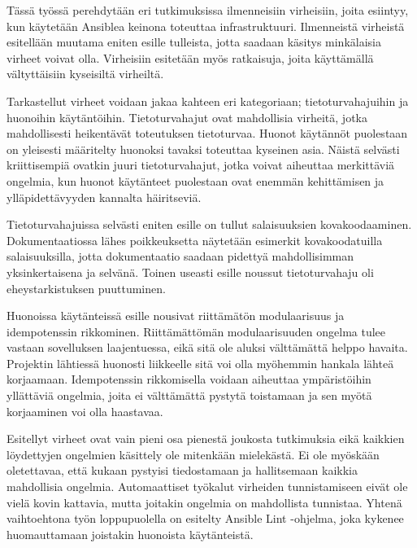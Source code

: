 Tässä työssä perehdytään eri tutkimuksissa ilmenneisiin virheisiin, joita
esiintyy, kun käytetään Ansiblea keinona toteuttaa infrastruktuuri.
Ilmenneistä virheistä esitellään muutama eniten esille tulleista, jotta
saadaan käsitys minkälaisia virheet voivat olla. Virheisiin esitetään
myös ratkaisuja, joita käyttämällä vältyttäisiin kyseisiltä virheiltä.

Tarkastellut virheet voidaan jakaa kahteen eri kategoriaan; tietoturvahajuihin
ja huonoihin käytäntöihin. Tietoturvahajut ovat mahdollisia virheitä, jotka
mahdollisesti heikentävät toteutuksen tietoturvaa. Huonot käytännöt puolestaan
on yleisesti määritelty huonoksi tavaksi toteuttaa kyseinen asia. Näistä
selvästi kriittisempiä ovatkin juuri tietoturvahajut, jotka voivat aiheuttaa
merkittäviä ongelmia, kun huonot käytänteet puolestaan ovat enemmän
kehittämisen ja ylläpidettävyyden kannalta häiritseviä.

Tietoturvahajuissa selvästi eniten esille on tullut salaisuuksien
kovakoodaaminen. Dokumentaatiossa lähes poikkeuksetta näytetään esimerkit
kovakoodatuilla salaisuuksilla, jotta dokumentaatio saadaan pidettyä
mahdollisimman yksinkertaisena ja selvänä. Toinen useasti esille noussut
tietoturvahaju oli eheystarkistuksen puuttuminen.

Huonoissa käytänteissä esille nousivat riittämätön modulaarisuus ja
idempotenssin rikkominen. Riittämättömän modulaarisuuden ongelma tulee vastaan
sovelluksen laajentuessa, eikä sitä ole aluksi välttämättä helppo havaita.
Projektin lähtiessä huonosti liikkeelle sitä voi olla myöhemmin hankala lähteä
korjaamaan. Idempotenssin rikkomisella voidaan aiheuttaa ympäristöihin
yllättäviä ongelmia, joita ei välttämättä pystytä toistamaan ja sen myötä
korjaaminen voi olla haastavaa.

Esitellyt virheet ovat vain pieni osa pienestä joukosta tutkimuksia eikä
kaikkien löydettyjen ongelmien käsittely ole mitenkään mielekästä. Ei ole
myöskään oletettavaa, että kukaan pystyisi tiedostamaan ja hallitsemaan
kaikkia mahdollisia ongelmia. Automaattiset työkalut virheiden tunnistamiseen
eivät ole vielä kovin kattavia, mutta joitakin ongelmia on mahdollista tunnistaa.
Yhtenä vaihtoehtona työn loppupuolella on esitelty Ansible Lint -ohjelma, joka
kykenee huomauttamaan joistakin huonoista käytänteistä.
